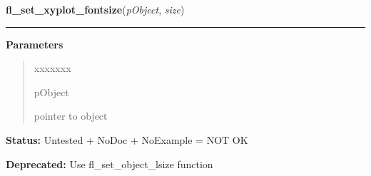 \hspace{.8\funcindent}\begin{boxedminipage}{\funcwidth}

    \raggedright \textbf{fl\_set\_xyplot\_fontsize}(\textit{pObject}, \textit{size})

    \vspace{-1.5ex}

    \rule{\textwidth}{0.5\fboxrule}
\setlength{\parskip}{2ex}
\setlength{\parskip}{1ex}
      \textbf{Parameters}
      \vspace{-1ex}

      \begin{quote}
        \begin{Ventry}{xxxxxxx}

          \item[pObject]

          pointer to object

        \end{Ventry}

      \end{quote}

\textbf{Status:} Untested + NoDoc + NoExample = NOT OK



\textbf{Deprecated:} Use fl\_set\_object\_lsize function



    \end{boxedminipage}

    \label{xformslib:deprecated:fl_set_xyplot_fontstyle}

    \vspace{0.5ex}


